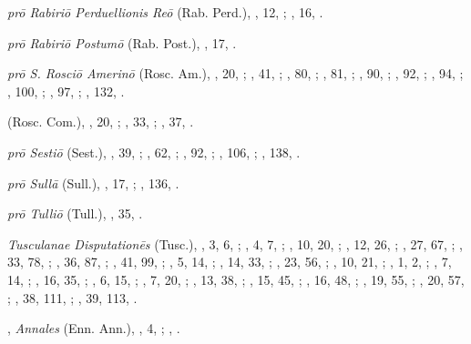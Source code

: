 \begin{autindex}
  \subitem \emph{prō Rabiriō Perduellionis Reō} (Rab. Perd.),
    , 12, ;
    , 16, .

  \subitem \emph{prō Rabiriō Postumō} (Rab. Post.),
    , 17, .

  \subitem \emph{prō S. Rosciō Amerinō} (Rosc. Am.),
    ,  20, ;
    ,  41, ;
    ,  80, ;
    ,  81, ;
    ,  90, ;
    ,  92, ;
    ,  94, ;
    , 100, ;
    ,  97, ;
    , 132, .

  \subitem \emph{} (Rosc. Com.),
    , 20, ;
    , 33, ;
    , 37, .

  \subitem \emph{prō Sestiō} (Sest.),
    ,  39, ;
    ,  62, ;
    ,  92, ;
    , 106, ;
    , 138, .

  \subitem \emph{prō Sullā} (Sull.),
    ,  17, ;
    , 136, .

  \subitem \emph{prō Tulliō} (Tull.),
    , 35, .

  \subitem \emph{Tusculanae Disputationēs} (Tusc.),
    ,  3,   6, ;
    ,  4,   7, ;
    , 10,  20, ;
    , 12,  26, ;
    , 27,  67, ;
    , 33,  78, ;
    , 36,  87, ;
    , 41,  99, ;
    ,  5,  14, ;
    , 14,  33, ;
    , 23,  56, ;
    , 10,  21, ;
    ,  1,   2, ;
    ,  7,  14, ;
    , 16,  35, ;
    ,  6,  15, ;
    ,  7,  20, ;
    , 13,  38, ;
    , 15,  45, ;
    , 16,  48, ;
    , 19,  55, ;
    , 20,  57, ;
    , 38, 111, ;
    , 39, 113, .

\indexspace

,
  \subitem \emph{Annales} (Enn. Ann.),
    , 4, ;
    , .


\end{autindex}
